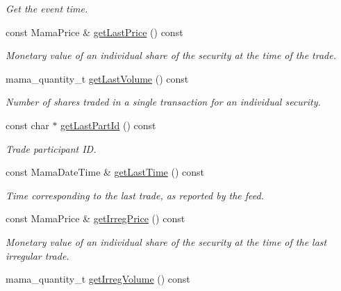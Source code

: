\begin{CompactItemize}
\begin{CompactList}\small\item\em Get the event time. \item\end{CompactList}\item 
const Mama\-Price \& \hyperlink{classWombat_1_1MamdaTradeListener_71cbfa975acf8586bd072615f32337ff}{get\-Last\-Price} () const 
\begin{CompactList}\small\item\em Monetary value of an individual share of the security at the time of the trade. \item\end{CompactList}\item 
mama\_\-quantity\_\-t \hyperlink{classWombat_1_1MamdaTradeListener_d8de6f0f0a88393c9f57d9627570ee96}{get\-Last\-Volume} () const 
\begin{CompactList}\small\item\em Number of shares traded in a single transaction for an individual security. \item\end{CompactList}\item 
const char $\ast$ \hyperlink{classWombat_1_1MamdaTradeListener_2e1bdae3c8609e4b8fe5709c0ea5c0f2}{get\-Last\-Part\-Id} () const 
\begin{CompactList}\small\item\em Trade participant ID. \item\end{CompactList}\item 
const Mama\-Date\-Time \& \hyperlink{classWombat_1_1MamdaTradeListener_e113087de67a4d24fae82add1dfdaba2}{get\-Last\-Time} () const 
\begin{CompactList}\small\item\em Time corresponding to the last trade, as reported by the feed. \item\end{CompactList}\item 
const Mama\-Price \& \hyperlink{classWombat_1_1MamdaTradeListener_95fdb22b7d58d3767d31a82ced35df77}{get\-Irreg\-Price} () const 
\begin{CompactList}\small\item\em Monetary value of an individual share of the security at the time of the last irregular trade. \item\end{CompactList}\item 
mama\_\-quantity\_\-t \hyperlink{classWombat_1_1MamdaTradeListener_9af4b2845a866803636bdd1983940a28}{get\-Irreg\-Volume} () const 

\end{CompactItemize}
